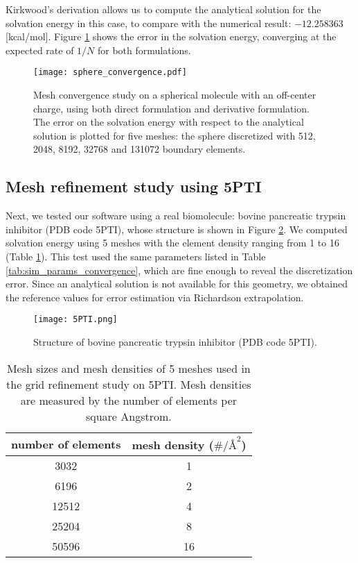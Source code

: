Kirkwood's derivation \cite{kirkwood1934theory} allows us to compute the analytical solution for the solvation energy in this case, to compare with the numerical result: $-12.258363$ [kcal/mol].
Figure \ref{fig:sphere_convergence} shows the error in the solvation energy, converging at the expected rate of $1/N$ for both formulations.

\begin{figure}%
    \centering
    \texttt{[image: sphere\_convergence.pdf]} 
    \caption{Mesh convergence study on a spherical molecule with an off-center charge, using both direct formulation and derivative formulation. The error on the solvation energy  with respect to the analytical solution is plotted for five meshes:
    the sphere discretized with 512, 2048, 8192, 32768 and 131072 boundary elements.}
    \label{fig:sphere_convergence}
\end{figure}

\subsection{Mesh refinement study using 5PTI} \label{result_convergence_5PTI}

Next, we tested our software using a real biomolecule: bovine pancreatic trypsin inhibitor (PDB code 5PTI), whose structure \cite{wlodawer1984structure} is shown in Figure \ref{fig:5PTI_structure}.
We computed solvation energy using 5 meshes with the element density ranging from 1 to 16 (Table \ref{tab:5PTI_mesh}).
This test used the same parameters listed in Table \ref{tab:sim_params_convergence}, which are fine enough to reveal the discretization error.
Since an analytical solution is not available for this geometry, we obtained the reference values for error estimation via Richardson extrapolation.

\begin{figure}%
    \centering
    \texttt{[image: 5PTI.png]}
    \caption{Structure of bovine pancreatic trypsin inhibitor (PDB code 5PTI).}
    \label{fig:5PTI_structure}
\end{figure}

\begin{table}[]
    \centering
    \begin{tabular}{cc}
    number of elements & mesh density ($\#/{\si{\angstrom}}^2$) \\
    \hline
    3032               & 1                                       \\
    6196               & 2                                       \\
    12512              & 4                                       \\
    25204              & 8                                       \\
    50596              & 16                                     
    \end{tabular}
    \caption{Mesh sizes and mesh densities of 5 meshes used in the grid refinement study on 5PTI. Mesh densities are measured by the number of elements per square Angstrom.}
    \label{tab:5PTI_mesh}
\end{table}

